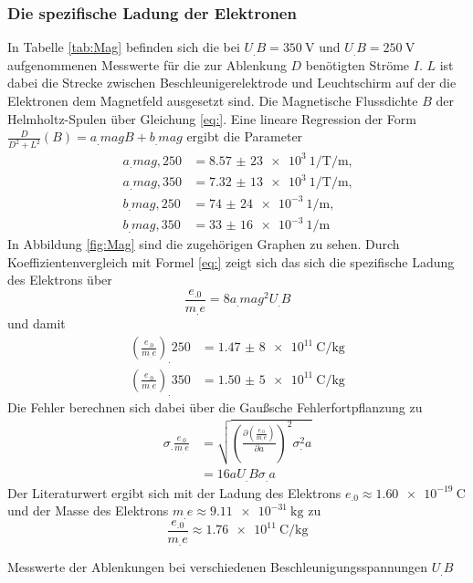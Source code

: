 \subsubsection{Die spezifische Ladung der Elektronen}
In Tabelle \ref{tab:Mag} befinden sich die bei $U_.B=\SI{350}{\volt}$ und $U_.B=\SI{250}{\volt}$ aufgenommenen Messwerte für die zur Ablenkung $D$ benötigten Ströme $I$.
$L$ ist dabei die Strecke zwischen Beschleunigerelektrode und Leuchtschirm auf der die Elektronen dem Magnetfeld ausgesetzt sind.
Die Magnetische Flussdichte $B$ der Helmholtz-Spulen über Gleichung \eqref{eq:}.
Eine lineare Regression der Form $\frac{D}{D^2+L^2}(B)=a_.{mag}B+b_.{mag}$ ergibt die Parameter
\begin{align*}
a_.{mag,250}&=\SI{8,57(23)e3}{1\per\tesla\per\metre}\text{,}\\
a_.{mag,350}&=\SI{7,32(13)e3}{1\per\tesla\per\metre}\text{,}\\
b_.{mag,250}&=\SI{74(24)e-3}{1\per\metre}\text{,}\\
b_.{mag,350}&=\SI{33(16)e-3}{1\per\metre}
\end{align*}
In Abbildung \ref{fig:Mag} sind die zugehörigen Graphen zu sehen.
Durch Koeffizientenvergleich mit Formel \eqref{eq:} zeigt sich das sich die spezifische Ladung des Elektrons über
\[
\frac{e_.0}{m_.e}=8a_.{mag}^2U_.B
\]
und damit 
\begin{align*}
\left(\frac{e_.0}{m_.e}\right)_.{250}&=\SI{1,47(8)e11}{\coulomb\per\kilogram}\\
\left(\frac{e_.0}{m_.e}\right)_.{350}&=\SI{1,50(5)e11}{\coulomb\per\kilogram}
\end{align*}
Die Fehler berechnen sich dabei über die Gaußsche Fehlerfortpflanzung zu
\begin{align*}
\sigma_.{\frac{e_.0}{m_.e}}&=\sqrt{\left(\frac{\partial\left(\frac{e_.0}{m_.e}\right)}{\partial a}\right)^2\sigma^2_.a}\\
                           &=16aU_.B\sigma_.a
\end{align*}
Der Literaturwert ergibt sich mit der Ladung des Elektrons $e_.0\approx\SI{1,60e-19}{\coulomb}$ und der Masse des Elektrons $m_.e\approx\SI{9,11e-31}{\kilogram}$ zu 
\[
\frac{e_.0}{m_.e}\approx\SI{1,76e11}{\coulomb\per\kilogram}
\]
\begin{table}
\centering
\caption{Messwerte der Ablenkungen bei verschiedenen Beschleunigungsspannungen $U_.B$}

\label{tab:Mag}
\end{table}
